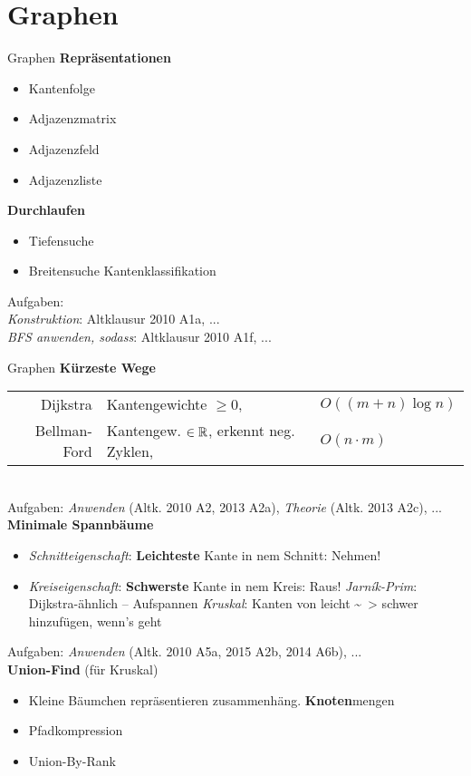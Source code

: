 \section{Graphen}

\begin{frame}{Graphen}
	\textbf{Repräsentationen} 
	\pause
	\begin{itemize}
		\item Kantenfolge
		\item Adjazenzmatrix
		\item Adjazenzfeld
		\item Adjazenzliste
	\end{itemize}
	
	\textbf{Durchlaufen}
	\begin{itemize}
		\item Tiefensuche
		\item Breitensuche
		\implitem Kantenklassifikation
	\end{itemize}
	
	\bigskip
	\small
	Aufgaben: \\
	\emph{Konstruktion}: Altklausur 2010 A1a, ... \\
	\emph{BFS anwenden, sodass}: Altklausur 2010 A1f, ...\\
\end{frame}

\begin{frame}{Graphen}
	\textbf{Kürzeste Wege}
	\begin{tabular}{rll}
		Dijkstra &  Kantengewichte $\geq 0$, & $O((m+n) \log n)$ \\
		Bellman-Ford & Kantengew. $\in \mathbb{R}$, erkennt neg. Zyklen, & $O(n \cdot m)$ 
	\end{tabular} \\
	\smallskip
	\hfill {\tiny Aufgaben: \emph{Anwenden} (Altk. 2010 A2, 2013 A2a), \emph{Theorie} (Altk. 2013 A2c), ...} \\
	\pause
	\textbf{Minimale Spannbäume}
	\begin{itemize}
		\item \emph{Schnitteigenschaft}: \textbf{Leichteste} Kante in nem Schnitt: Nehmen!
		\item \emph{Kreiseigenschaft}: \textbf{Schwerste} Kante in nem Kreis: Raus!
		\implitem \emph{Jarník-Prim}: Dijkstra-ähnlich – Aufspannen
		\implitem \emph{Kruskal}: Kanten von leicht \~~> schwer hinzufügen, wenn's geht
	\end{itemize}
	\hfill {\tiny Aufgaben: \emph{Anwenden} (Altk. 2010 A5a, 2015 A2b, 2014 A6b), ...} \\
	\pause
	\textbf{Union-Find} (für Kruskal)
	\begin{itemize}
		\item Kleine Bäumchen repräsentieren zusammenhäng. \textbf{Knoten}mengen
		\item Pfadkompression
		\item Union-By-Rank
	\end{itemize}
\end{frame}


